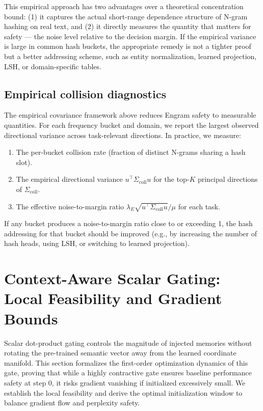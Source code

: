 \documentclass[preprint,12pt]{elsarticle}
\begin{document}
This empirical approach has two advantages over a theoretical concentration bound: (1) it captures the actual short-range dependence structure of N-gram hashing on real text, and (2) it directly measures the quantity that matters for safety — the noise level relative to the decision margin. If the empirical variance is large in common hash buckets, the appropriate remedy is not a tighter proof but a better addressing scheme, such as entity normalization, learned projection, LSH, or domain-specific tables.

\subsection{Empirical collision diagnostics}

The empirical covariance framework above reduces Engram safety to measurable quantities. For each frequency bucket and domain, we report the largest observed directional variance across task-relevant directions. In practice, we measure:
\begin{enumerate}
    \item The per-bucket collision rate (fraction of distinct N-grams sharing a hash slot).
    \item The empirical directional variance $u^\top \Sigma_{\mathrm{coll}} u$ for the top-$K$ principal directions of $\Sigma_{\mathrm{coll}}$.
    \item The effective noise-to-margin ratio $\lambda_E \sqrt{u^\top \Sigma_{\mathrm{coll}} u} / \mu$ for each task.
\end{enumerate}
If any bucket produces a noise-to-margin ratio close to or exceeding 1, the hash addressing for that bucket should be improved (e.g., by increasing the number of hash heads, using LSH, or switching to learned projection).

\section{Context-Aware Scalar Gating: Local Feasibility and Gradient Bounds}
\label{app:proof40}

Scalar dot-product gating controls the magnitude of injected memories without rotating the pre-trained semantic vector away from the learned coordinate manifold. This section formalizes the first-order optimization dynamics of this gate, proving that while a highly contractive gate ensures baseline performance safety at step 0, it risks gradient vanishing if initialized excessively small. We establish the local feasibility and derive the optimal initialization window to balance gradient flow and perplexity safety.
\end{document}
